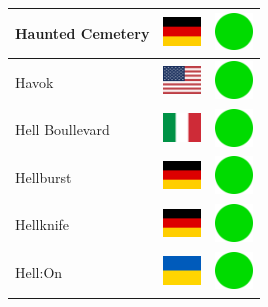\documentclass[12pt, a4paper, twoside]{report}
\begin{document}
\begin{center}
\begin{longtable}{|p{5cm}|p{2cm}|p{2cm}|}
Haunted Cemetery & \includegraphics[width=1cm]{4x3/de} & \includegraphics[width=1cm]{likes/y} \\ \hline
Havok & \includegraphics[width=1cm]{4x3/us} & \includegraphics[width=1cm]{likes/y} \\ \hline
Hell Boullevard & \includegraphics[width=1cm]{4x3/it} & \includegraphics[width=1cm]{likes/y} \\ \hline
Hellburst & \includegraphics[width=1cm]{4x3/de} & \includegraphics[width=1cm]{likes/y} \\ \hline
Hellknife & \includegraphics[width=1cm]{4x3/de} & \includegraphics[width=1cm]{likes/y} \\ \hline
Hell:On & \includegraphics[width=1cm]{4x3/ua} & \includegraphics[width=1cm]{likes/y} \\ \hline

\end{longtable}
\end{center}
\end{document}
